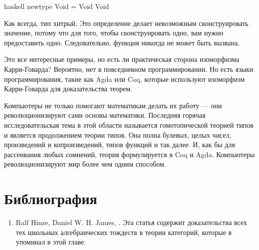 \begin{snip}{haskell}
newtype Void = Void Void
\end{snip}
Как всегда, тип  хитрый. Это определение делает
невозможным сконструировать значение, потому что для того, чтобы сконструировать одно, вам
нужно предоставить одно. Следовательно, функция  никогда
не может быть вызвана.

Это все интересные примеры, но есть ли практическая сторона
изоморфизма Карри-Говарда? Вероятно, нет в повседневном программировании. Но
есть языки программирования, такие как Agda или Coq, которые используют
изоморфизм Карри-Говарда для доказательства теорем.

Компьютеры не только помогают математикам делать их работу --- они
революционизируют сами основы математики. Последняя горячая
исследовательская тема в этой области называется гомотопической теорией типов и является
продолжением теории типов. Она полна булевых, целых чисел, произведений и
копроизведений, типов функций и так далее. И, как бы для рассеивания любых сомнений,
теория формулируется в Coq и Agda. Компьютеры
революционизируют мир более чем одним способом.

\section{Библиография}

\begin{enumerate}
  \tightlist
  \item
        Ralf Hinze, Daniel W. H. James,
        . Эта статья содержит доказательства всех тех школьных
        алгебраических тождеств в теории категорий, которые я упоминал в этой
        главе.
\end{enumerate}
